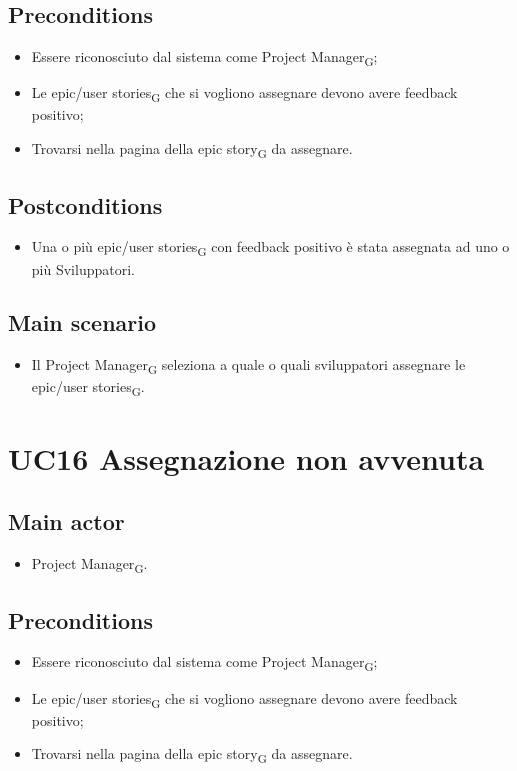 \documentclass{article}
\begin{document}
    \subsection*{Preconditions}
        \begin{itemize}
            \item Essere riconosciuto dal sistema come Project Manager\textsubscript{G};
            \item Le epic/user stories\textsubscript{G} che si vogliono assegnare devono avere feedback positivo;
            \item Trovarsi nella pagina della epic story\textsubscript{G} da assegnare.
        \end{itemize}
        
    \subsection*{Postconditions}
        \begin{itemize}
            \item Una o più epic/user stories\textsubscript{G} con feedback positivo è stata assegnata ad uno o più Sviluppatori.
        \end{itemize}

    \subsection*{Main scenario}
    \begin{itemize}
        \item Il Project Manager\textsubscript{G} seleziona a quale o quali sviluppatori assegnare le epic/user stories\textsubscript{G}.
    \end{itemize}

\section{UC16 Assegnazione non avvenuta}

       \subsection*{Main actor}
    \begin{itemize}
        \item Project Manager\textsubscript{G}.
    \end{itemize}
    
    \subsection*{Preconditions}
        \begin{itemize}
            \item Essere riconosciuto dal sistema come Project Manager\textsubscript{G};
            \item Le epic/user stories\textsubscript{G} che si vogliono assegnare devono avere feedback positivo;
            \item Trovarsi nella pagina della epic story\textsubscript{G} da assegnare.
        \end{itemize}
        
\end{document}
